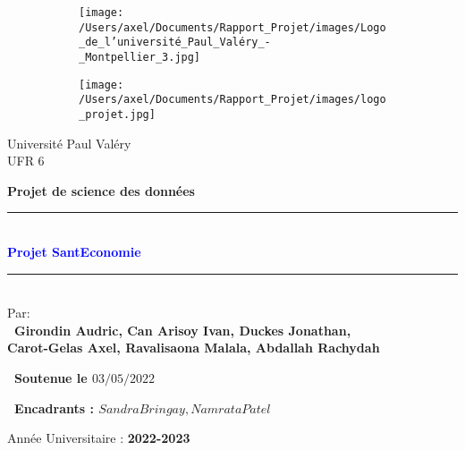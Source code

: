 \documentclass[12pt,a4paper]{report}
\begin{document}
\begin{titlepage}

\begin{center}
\begin{figure}[h]
    \centering
    \begin{subfigure}{0.3\textwidth}
        \centering
        \texttt{[image: /Users/axel/Documents/Rapport\_Projet/images/Logo\_de\_l'université\_Paul\_Valéry\_-\_Montpellier\_3.jpg]}
    \end{subfigure}
    \hspace{3,5cm}
    \begin{subfigure}{0.4\textwidth}
        \centering
        \texttt{[image: /Users/axel/Documents/Rapport\_Projet/images/logo\_projet.jpg]}
    \end{subfigure}
    \label{fig:images}
\end{figure}

\medskip
{\Large{Universit\'{e} Paul Val\'{e}ry }}\\
\textsc{UFR 6}\\
 \vskip0.5cm
  \noindent {\textsc{\LARGE \textcolor{blue}{Licence MIASHS}}\\[1cm]}
\end{center}
\vskip0.5cm
\begin{center}
\textbf{Projet de science des donn\'{e}es}\\
\vskip0.5cm
\newcommand{\HRule}{\rule{\linewidth}{0.5mm}} 
	\HRule\\[0.2cm]
	{\huge\bfseries\textcolor{blue}{Projet SantEconomie\\[0.2cm]}}
	\HRule\\[1cm]
Par: \\
\small \bf{\ Girondin Audric, Can Arisoy Ivan, Duckes Jonathan, \\ Carot-Gelas Axel, Ravalisaona Malala, Abdallah Rachydah}
\end{center}
  \vspace{3mm}
  \centerline {\small \bf{\ Soutenue le $03/05/2022$}}
  \vspace{3mm}
  \centerline {\small \bf{\ Encadrants : $Sandra Bringay, Namrata Patel$}} 
\vskip2.5cm
\begin{center}
{\small{Année Universitaire : \textbf{2022-2023}}} \\
\end{center}

\end{titlepage}
\end{document}
